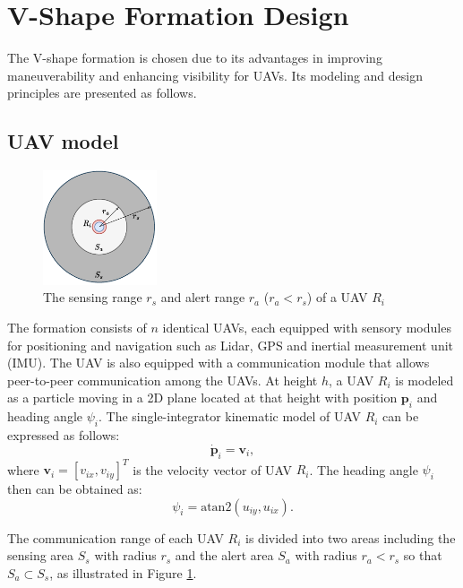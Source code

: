 \section{V-Shape Formation Design} \label{sec:0design}
The V-shape formation is chosen due to its advantages in improving maneuverability and enhancing visibility for UAVs. Its modeling and design principles are presented as follows. 
\subsection{UAV model}
\begin{figure}
    \centering
    \includegraphics[width=0.3\textwidth]{paper1/images/model.pdf}
    \caption{The sensing range $r_s$ and alert range $r_a$ ($r_a<r_s$) of a UAV $R_i$}
    \label{fig:chap2_model}
\end{figure}
 
The formation consists of $n$ identical UAVs, each equipped with sensory modules for positioning and navigation such as Lidar, GPS and inertial measurement unit (IMU). The UAV is also equipped with a communication module that allows peer-to-peer communication among the UAVs. At height $h$, a UAV $R_i$ is modeled as a particle moving in a 2D plane located at that height with position $\mathbf{p}_i$ and heading angle $\psi_i$. The single-integrator kinematic model of UAV $R_i$ can be expressed as follows:
\begin{equation}
    \dot{\mathbf{p}}_i = \mathbf{v}_i,
\end{equation}
where $\mathbf{v}_i=[v_{ix},v_{iy}]^T$ is the velocity vector of UAV $R_i$. The heading angle $\psi_i$ then can be obtained as:
\begin{equation}
    \psi_i=\text{atan2}(u_{iy},u_{ix}).
\end{equation}

The communication range of each UAV $R_i$ is divided into two areas including the sensing area $S_s$ with radius $r_s$ and the alert area $S_a$ with radius $r_a<r_s$ so that $S_a\subset S_s$, as illustrated in Figure \ref{fig:chap2_model}.

